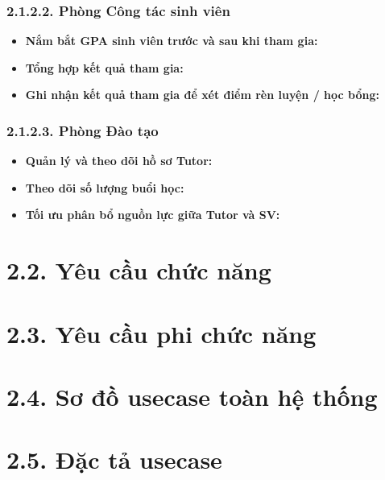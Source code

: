 
\subsubsection*{2.1.2.2. Phòng Công tác sinh viên}
\begin{itemize}
    \item \textbf{Nắm bắt GPA sinh viên trước và sau khi tham gia:}
    \item \textbf{Tổng hợp kết quả tham gia:}
    \item \textbf{Ghi nhận kết quả tham gia để xét điểm rèn luyện / học bổng:}
\end{itemize}


\subsubsection*{2.1.2.3. Phòng Đào tạo}
\begin{itemize}
    \item \textbf{Quản lý và theo dõi hồ sơ Tutor:}
    \item \textbf{Theo dõi số lượng buổi học:}
    \item \textbf{Tối ưu phân bổ nguồn lực giữa Tutor và SV:}
\end{itemize}



\section*{2.2. Yêu cầu chức năng}



\section*{2.3. Yêu cầu phi chức năng}



\section*{2.4. Sơ đồ usecase toàn hệ thống}



\section*{2.5. Đặc tả usecase}
